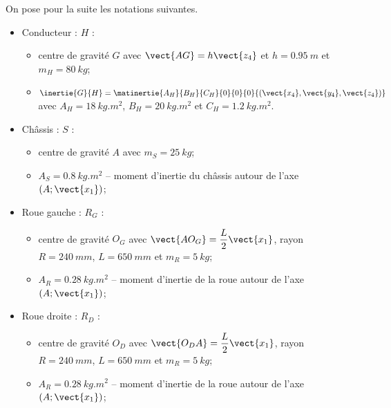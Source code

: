 \documentclass[10pt,fleqn]{article} %
\begin{document}
\ifprof
\else

On pose pour la suite les notations suivantes.

\begin{itemize}
\item Conducteur : $H$ : 
\begin{itemize}
\item centre de gravité $G$ avec $\vect{AG}=h\vect{z_4}$ et $h=\SI{0,95}{m}$ et $m_H = \SI{80}{kg}$;
\item $\inertie{G}{H} = \matinertie{A_H}{B_H}{C_H}{0}{0}{0}{\left(\vect{x_4},\vect{y_4},\vect{z_4}\right)}$ avec $A_H =\SI{18}{kg.m^2}$, $B_H =\SI{20}{kg.m^2}$ et $C_H =\SI{1,2}{kg.m^2}$.
\end{itemize}
\item Châssis : $S$ : 
\begin{itemize}
\item centre de gravité $A$ avec $m_S = \SI{25}{kg}$;
\item $A_S =\SI{0,8}{kg.m^2}$ -- moment d'inertie du châssis autour de l'axe $\left(A;\vect{x_1} \right)$; %
\end{itemize}
\item Roue gauche : $R_G$ : 
\begin{itemize}
\item centre de gravité $O_G$ avec $\vect{AO_G}=\dfrac{L}{2}\vect{x_1}$, rayon $R=\SI{240}{mm}$, $L=\SI{650}{mm}$ et $m_R = \SI{5}{kg}$;
\item $A_R =\SI{0,28}{kg.m^2}$ -- moment d'inertie de la roue autour de l'axe $\left(A;\vect{x_1} \right)$; %
\end{itemize}
\item Roue droite : $R_D$ : 
\begin{itemize}
\item centre de gravité $O_D$ avec $\vect{O_DA}=\dfrac{L}{2}\vect{x_1}$, rayon $R=\SI{240}{mm}$, $L=\SI{650}{mm}$ et $m_R = \SI{5}{kg}$;
\item $A_R =\SI{0,28}{kg.m^2}$ -- moment d'inertie de la roue autour de l'axe $\left(A;\vect{x_1} \right)$; %
\end{itemize}
\end{itemize}
\end{document}
